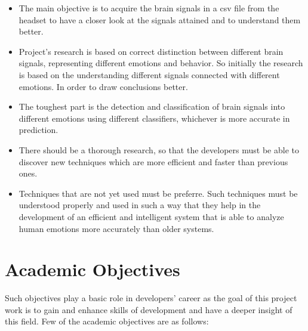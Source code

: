 \documentclass[a4paper, 12pt, oneside]{uet_thesis}
\begin{document}
\begin{itemize}
\item The main objective is to acquire the brain signals in a csv file from the headset to have a closer look at the signals attained and to understand them better.
\item Project’s research is based on correct distinction between different brain signals, representing different emotions and behavior. So initially the research is based on the understanding different signals connected with different emotions. In order to draw conclusions better.
\item The toughest part is the detection and classification of brain signals into different emotions using different classifiers, whichever is more accurate in prediction\cite{b10}.
\item There should be a thorough research, so that the developers must be able to discover new techniques which are more efficient and faster than previous ones.
\item Techniques that are not yet used must be preferre\cite{b20}. Such techniques must be understood properly and used in such a way that they help in the development of an efficient and intelligent system that is able to analyze human emotions more accurately than older systems.
\end{itemize}

\section{Academic Objectives}
Such objectives play a basic role in developers’ career as the goal of this project work is to gain and enhance skills of development and have a deeper insight of this field. 
Few of the academic objectives are as follows:
\end{document}
